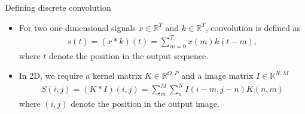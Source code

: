 \documentclass{beamer}
\begin{document}
		
		 \begin{frame}{Defining discrete convolution}
		\begin{itemize}
			\item For two one-dimensional signals $x \in \mathbb{R}^T$
        and $k \in \mathbb{R}^T$, convolution is defined as
        \begin{align}
            s(t) = (x * k)(t) = \sum_{m=0}^{T} x(m)k(t - m),
        \end{align}
				where $t$ denote the position in the output sequence. 
        \item In 2D, we require a kernel matrix $K \in \mathbb{R}^{O,P}$ and a image matrix
        $I \in \mathbb{K}^{N,M}$
        \begin{align}
            S(i,j) = (K * I)(i,j) = \sum_m^M \sum_n^N I(i-m, j-n)K(n,m)
        \end{align}
				where $(i,j)$ denote the position in the output image.
				\end{itemize}
    \end{frame}
\end{document}
